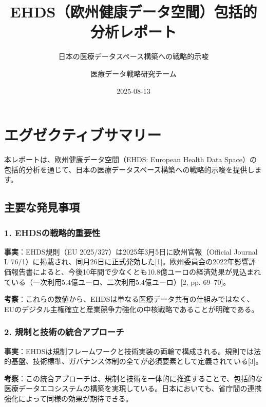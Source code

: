 \documentclass[
  a4paper,
  a4paper,
  11pt]{ltjsbook}
\title{EHDS（欧州健康データ空間）包括的分析レポート}
\subtitle{日本の医療データスペース構築への戦略的示唆}
\author{医療データ戦略研究チーム}
\date{2025-08-13}
\renewcommand*\contentsname{Table of contents}
\newcommand\contentsname{Table of contents}
\begin{document}
\maketitle

\renewcommand*\contentsname{Table of contents}
{
\hypersetup{linkcolor=}
\setcounter{tocdepth}{2}
\tableofcontents
}


\chapter{エグゼクティブサマリー}\label{ux30a8ux30b0ux30bcux30afux30c6ux30a3ux30d6ux30b5ux30deux30eaux30fc}

本レポートは、欧州健康データ空間（EHDS: European Health Data
Space）の包括的分析を通じて、日本の医療データスペース構築への戦略的示唆を提供します。

\section{主要な発見事項}\label{ux4e3bux8981ux306aux767aux898bux4e8bux9805}

\subsection{1.
EHDSの戦略的重要性}\label{ehdsux306eux6226ux7565ux7684ux91cdux8981ux6027}

\textbf{事実}：EHDS規則（EU 2025/327）は2025年3月5日に欧州官報（Official
Journal L
76/1）に掲載され、同月26日に正式発効した{[}1{]}。欧州委員会の2022年影響評価報告書によると、今後10年間で少なくとも10.8億ユーロの経済効果が見込まれている（一次利用5.4億ユーロ、二次利用5.4億ユーロ）{[}2,
pp. 69--70{]}。

\textbf{考察}：これらの数値から、EHDSは単なる医療データ共有の仕組みではなく、EUのデジタル主権確立と産業競争力強化の中核戦略であることが明確である。

\subsection{2.
規制と技術の統合アプローチ}\label{ux898fux5236ux3068ux6280ux8853ux306eux7d71ux5408ux30a2ux30d7ux30edux30fcux30c1}

\textbf{事実}：EHDSは規制フレームワークと技術実装の両輪で構成される。規則では法的基盤、技術標準、ガバナンス体制の全てが必須要素として定義されている{[}3{]}。

\textbf{考察}：この統合アプローチは、規制と技術を一体的に推進することで、包括的な医療データエコシステムの構築を実現している。日本においても、省庁間の連携強化によって同様の効果が期待できる。
\end{document}
